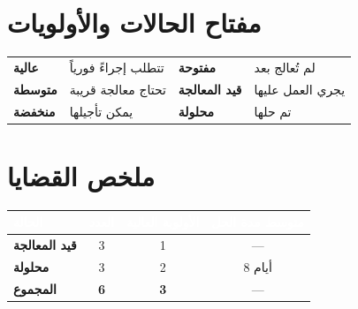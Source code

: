 \documentclass[11pt,a4paper,landscape]{article}
\begin{document}
\section*{مفتاح الحالات والأولويات}

\begin{center}
\renewcommand{\arraystretch}{1.5}
\begin{tabular}{|l|l||l|l|}
\hline
\rowcolor{headerColor}
\multicolumn{4}{|c|}{\textcolor{white}{\textbf{الحالات والأولويات}}} \\
\hline
\color{issueOpen}\textbf{عالية} & تتطلب إجراءً فورياً & \color{issueOpen}\textbf{مفتوحة} & لم تُعالج بعد \\
\hline
\color{issueProgress}\textbf{متوسطة} & تحتاج معالجة قريبة & \color{issueProgress}\textbf{قيد المعالجة} & يجري العمل عليها \\
\hline
\color{issueResolved}\textbf{منخفضة} & يمكن تأجيلها & \color{issueResolved}\textbf{محلولة} & تم حلها \\
\hline
\end{tabular}
\end{center}

\vspace{1em}

\section*{ملخص القضايا}

\begin{tabular}{|l|c|c|c|}
\hline
\rowcolor{headerColor}
\textcolor{white}{\textbf{الحالة}} & \textcolor{white}{\textbf{العدد}} & \textcolor{white}{\textbf{الأولوية العالية}} & \textcolor{white}{\textbf{متوسط مدة الحل}} \\
\hline
\color{issueProgress}\textbf{قيد المعالجة} & 3 & 1 & --- \\
\hline
\color{issueResolved}\textbf{محلولة} & 3 & 2 & 8 أيام \\
\hline
\textbf{المجموع} & \textbf{6} & \textbf{3} & --- \\
\hline
\end{tabular}
\end{document}
